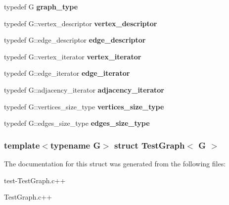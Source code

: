 \begin{DoxyCompactItemize}
\item 
\hypertarget{structTestGraph_a149d9d185e2299b108590e2f83804351}{typedef \-G {\bfseries graph\-\_\-type}}\label{structTestGraph_a149d9d185e2299b108590e2f83804351}

\item 
\hypertarget{structTestGraph_aa82e61846643af7ce36a6993b81b9aa3}{typedef \-G\-::vertex\-\_\-descriptor {\bfseries vertex\-\_\-descriptor}}\label{structTestGraph_aa82e61846643af7ce36a6993b81b9aa3}

\item 
\hypertarget{structTestGraph_aa20b87dd86a6d46d79cd5eead7e3ecd8}{typedef \-G\-::edge\-\_\-descriptor {\bfseries edge\-\_\-descriptor}}\label{structTestGraph_aa20b87dd86a6d46d79cd5eead7e3ecd8}

\item 
\hypertarget{structTestGraph_ae82be295babd001adfdf636fc39a79f8}{typedef \-G\-::vertex\-\_\-iterator {\bfseries vertex\-\_\-iterator}}\label{structTestGraph_ae82be295babd001adfdf636fc39a79f8}

\item 
\hypertarget{structTestGraph_a4a62a3acea29caad985cde5504e4222d}{typedef \-G\-::edge\-\_\-iterator {\bfseries edge\-\_\-iterator}}\label{structTestGraph_a4a62a3acea29caad985cde5504e4222d}

\item 
\hypertarget{structTestGraph_af50caf6f726568b4165d4a1dc5b75cc3}{typedef \-G\-::adjacency\-\_\-iterator {\bfseries adjacency\-\_\-iterator}}\label{structTestGraph_af50caf6f726568b4165d4a1dc5b75cc3}

\item 
\hypertarget{structTestGraph_a808d6ca09652f1c14f6a68ca42beb447}{typedef \-G\-::vertices\-\_\-size\-\_\-type {\bfseries vertices\-\_\-size\-\_\-type}}\label{structTestGraph_a808d6ca09652f1c14f6a68ca42beb447}

\item 
\hypertarget{structTestGraph_a308c6aa7034bf56790d592b0fc259851}{typedef \-G\-::edges\-\_\-size\-\_\-type {\bfseries edges\-\_\-size\-\_\-type}}\label{structTestGraph_a308c6aa7034bf56790d592b0fc259851}

\end{DoxyCompactItemize}
\subsubsection*{template$<$typename G$>$ struct Test\-Graph$<$ G $>$}



\-The documentation for this struct was generated from the following files\-:\begin{DoxyCompactItemize}
\item 
test-\/\-Test\-Graph.\-c++\item 
\-Test\-Graph.\-c++\end{DoxyCompactItemize}
